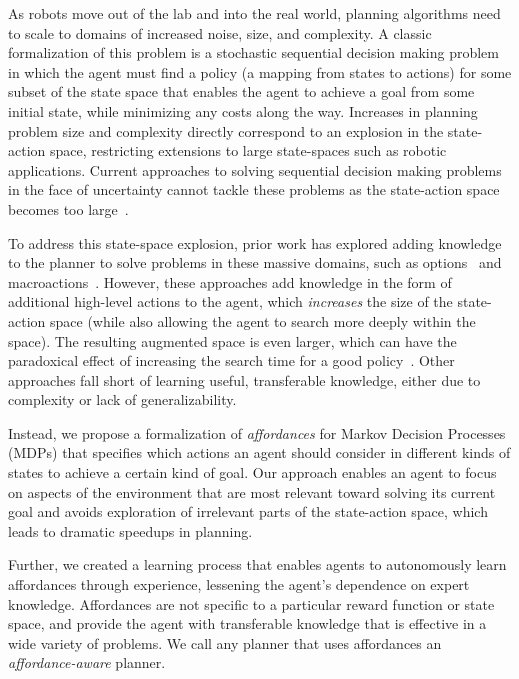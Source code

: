 \documentclass[conference]{IEEEtran}
\begin{document}
As robots move out of the lab and into the real world, planning
algorithms need to scale to domains of increased noise, size, and
complexity.  A classic formalization of this problem is a stochastic
sequential decision making problem in which the agent must find a
policy (a mapping from states to actions) for some subset of the state
space that enables the agent to achieve a goal from some initial
state, while minimizing any costs along the way.
Increases in planning problem size and complexity directly correspond
to an explosion in the state-action space, restricting extensions to large state-spaces
such as robotic applications. Current approaches to solving 
sequential decision making problems in the face of uncertainty cannot tackle these problems 
as the state-action space becomes too large~\cite{grounds05}.

To address this state-space explosion, prior work has explored adding
knowledge to the planner to solve problems in these
massive domains, such as options~\cite{sutton99} and
macroactions~\cite{Botea:2005kx,Newton:2005vn}. However, these
approaches add knowledge in the form of additional high-level actions
to the agent, which {\em increases} the size of the state-action space
(while also allowing the agent to search more deeply within the
space).  The resulting augmented space is even larger, which can have
the paradoxical effect of increasing the search time for a good
policy~\cite{Jong:2008zr}. Other approaches fall short of learning useful, transferable knowledge,
either due to complexity or lack of generalizability.

Instead, we propose a formalization of {\em affordances} \cite{gibson77} for Markov Decision Processes (MDPs) that
specifies which actions an agent should consider in different kinds of states to achieve a certain kind of goal.
Our approach enables an agent to focus on
aspects of the environment that are most relevant toward solving its current goal 
and avoids exploration of irrelevant parts of the 
state-action space, which leads to dramatic speedups in planning.

Further, we created a learning process that enables agents to
autonomously learn affordances through experience, lessening the
agent's dependence on expert knowledge. Affordances are not specific
to a particular reward function or state space, and provide the agent
with transferable knowledge that is effective in a wide variety of
problems. We call any planner that uses affordances an {\it
  affordance-aware} planner.
\end{document}
